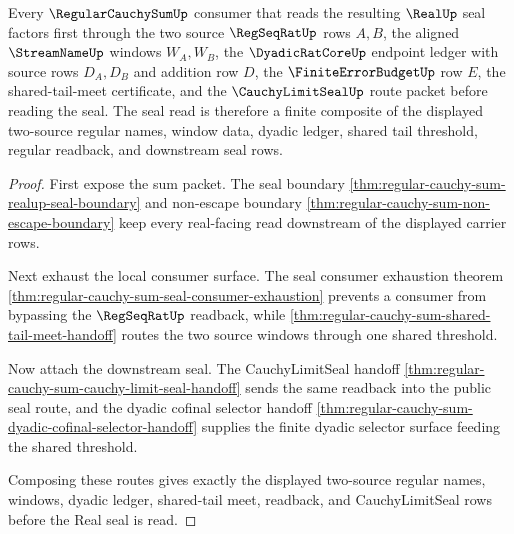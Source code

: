 \begin{theorem}
\label{thm:regular-cauchy-sum-real-seal-route}
Every $\RegularCauchySumUp$ consumer that reads the resulting $\RealUp$ seal factors first through the two source $\RegSeqRatUp$ rows $A,B$, the aligned $\StreamNameUp$ windows $W_A,W_B$, the $\DyadicRatCoreUp$ endpoint ledger with source rows $D_A,D_B$ and addition row $D$, the $\FiniteErrorBudgetUp$ row $E$, the shared-tail-meet certificate, and the $\CauchyLimitSealUp$ route packet before reading the seal. The seal read is therefore a finite composite of the displayed two-source regular names, window data, dyadic ledger, shared tail threshold, regular readback, and downstream seal rows.
\end{theorem}
\begin{proof}
First expose the sum packet. The seal boundary \autoref{thm:regular-cauchy-sum-realup-seal-boundary} and non-escape boundary \autoref{thm:regular-cauchy-sum-non-escape-boundary} keep every real-facing read downstream of the displayed carrier rows.

Next exhaust the local consumer surface. The seal consumer exhaustion theorem \autoref{thm:regular-cauchy-sum-seal-consumer-exhaustion} prevents a consumer from bypassing the $\RegSeqRatUp$ readback, while \autoref{thm:regular-cauchy-sum-shared-tail-meet-handoff} routes the two source windows through one shared threshold.

Now attach the downstream seal. The CauchyLimitSeal handoff \autoref{thm:regular-cauchy-sum-cauchy-limit-seal-handoff} sends the same readback into the public seal route, and the dyadic cofinal selector handoff \autoref{thm:regular-cauchy-sum-dyadic-cofinal-selector-handoff} supplies the finite dyadic selector surface feeding the shared threshold.

Composing these routes gives exactly the displayed two-source regular names, windows, dyadic ledger, shared-tail meet, readback, and CauchyLimitSeal rows before the Real seal is read.
\end{proof}


